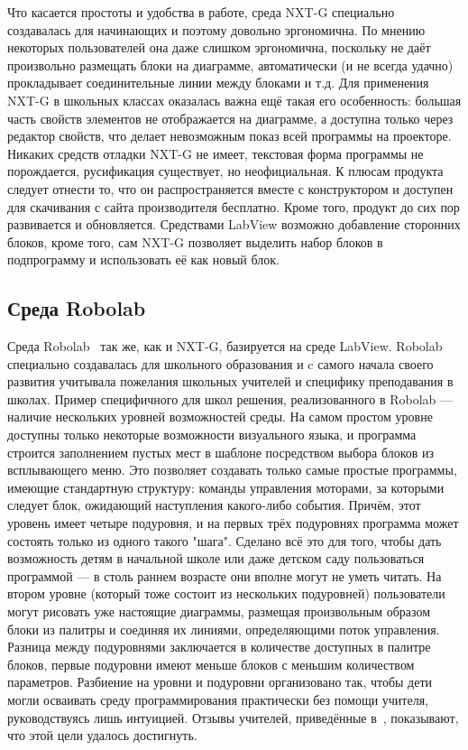 \documentclass[a4paper]{article}
\begin{document}
Что касается простоты и удобства в работе, среда NXT-G специально создавалась для начинающих и поэтому довольно эргономична. По мнению некоторых пользователей она даже слишком эргономична, поскольку не даёт произвольно размещать блоки на диаграмме, автоматически (и не всегда удачно) прокладывает соединительные линии между блоками и т.д. Для применения NXT-G в школьных классах оказалась важна ещё такая его особенность: большая часть свойств элементов не отображается на диаграмме, а доступна только через редактор свойств, что делает невозможным показ всей программы на проекторе. Никаких средств отладки NXT-G не имеет, текстовая форма программы не порождается, русификация существует, но неофициальная. К плюсам продукта следует отнести то, что он распространяется вместе с конструктором и доступен для скачивания с сайта производителя бесплатно. Кроме того, продукт до сих пор развивается и обновляется. Средствами LabView возможно добавление сторонних блоков, кроме того, сам NXT-G позволяет выделить набор блоков в подпрограмму и использовать её как новый блок.

\subsection{Среда Robolab}
Среда Robolab~\cite{robolab} так же, как и NXT-G, базируется на среде LabView. Robolab специально создавалась для школьного образования и c самого начала своего развития учитывала пожелания школьных учителей и специфику преподавания в школах. Пример специфичного для школ решения, реализованного в Robolab --- наличие нескольких уровней возможностей среды. На самом простом уровне доступны только некоторые возможности визуального языка, и программа строится заполнением пустых мест в шаблоне посредством выбора блоков из всплывающего меню. Это позволяет создавать только самые простые программы, имеющие стандартную структуру: команды управления моторами, за которыми следует блок, ожидающий наступления какого-либо события. Причём, этот уровень имеет четыре подуровня, и на первых трёх подуровнях программа может состоять только из одного такого "шага". Сделано всё это для того, чтобы дать возможность детям в начальной школе или даже детском саду пользоваться программой --- в столь раннем возрасте они вполне могут не уметь читать. На втором уровне (который тоже состоит из нескольких подуровней) пользователи могут рисовать уже настоящие диаграммы, размещая произвольным образом блоки из палитры и соединяя их линиями, определяющими поток управления. Разница между подуровнями заключается в количестве доступных в палитре блоков, первые подуровни имеют меньше блоков с меньшим количеством параметров. Разбиение на уровни и подуровни организовано так, чтобы дети могли осваивать среду программирования практически без помощи учителя, руководствуясь лишь интуицией. Отзывы учителей, приведённые в~\cite{robolab}, показывают, что этой цели удалось достигнуть.
\end{document}
